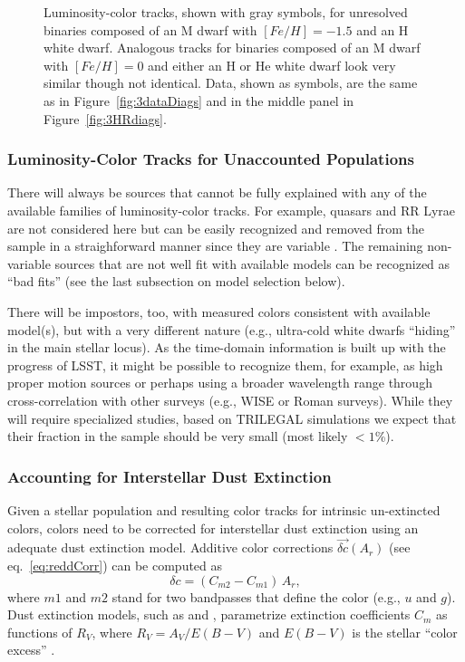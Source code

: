 \begin{figure}[ht!]
\caption{Luminosity-color tracks, shown with gray symbols, for unresolved binaries composed of an M dwarf with
  $[Fe/H]=-1.5$ and an H white dwarf. Analogous tracks for binaries composed of an M dwarf with
  $[Fe/H]=0$ and either an H or He white dwarf look very similar though not identical. Data, shown as symbols,
  are the same as in Figure~\ref{fig:3dataDiags} and in the middle panel in Figure~\ref{fig:3HRdiags}.} 
\label{fig:locusBinaries}
\end{figure}

 


\subsubsection{Luminosity-Color Tracks for Unaccounted Populations}

There will always be sources that cannot be fully explained with any of the available families of
luminosity-color tracks. For example, quasars and RR Lyrae are not considered here
but can be easily recognized and removed from the sample in a straighforward manner since
they are variable \citep[e.g., see][]{2007AJ....134.2236S}. The remaining non-variable sources
that are not well fit with available models can be recognized as ``bad fits'' (see the last subsection on
model selection below). 

There will be impostors, too, with measured colors consistent with available model(s), but
with a very different nature (e.g., ultra-cold white dwarfs ``hiding'' in the main stellar locus).
As the time-domain information is built up with the progress of LSST, 
it might be possible to recognize them, for example, as high proper motion sources or perhaps
using a broader wavelength range through cross-correlation with other surveys (e.g., WISE or
Roman surveys). While they will require specialized studies, based on TRILEGAL simulations
we expect that their fraction in the sample should be very small (most likely $<1$\%). 


\subsubsection{Accounting for Interstellar Dust Extinction \label{sec:ismdust}} 

Given a stellar population and resulting color tracks for intrinsic un-extincted colors, colors need to
be corrected for interstellar dust extinction using an adequate dust extinction model. Additive color
corrections $\vec{\delta c}(A_r)$ (see eq.~\ref{eq:reddCorr}) can be computed as 
\begin{equation}
 \label{eq:extCorr} 
                      \delta c = (C_{m2}- C_{m1}) \, A_r,
\end{equation}
where $m1$ and $m2$ stand for two bandpasses that define the color (e.g., $u$ and $g$).  
Dust extinction models, such as \cite{1989ApJ...345..245C} and
\cite{1999PASP..111...63F}, parametrize extinction coefficients $C_{m}$ as functions of $R_V$, where
$R_V = A_V/E(B-V)$ and $E(B-V)$ is the stellar ``color excess'' \citep{1989ApJ...345..245C}.

